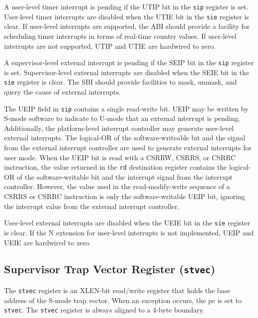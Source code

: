 A user-level timer interrupt is pending if the UTIP bit in the \texttt{sip}
register is set.  User-level timer interrupts are disabled when the UTIE bit
in the \texttt{sie} register is clear.  If user-level interrupts are supported,
the ABI should provide a facility for scheduling timer interrupts in terms of
real-time counter values.  If user-level interrupts are not supported, UTIP
and UTIE are hardwired to zero.

A supervisor-level external interrupt is pending if the SEIP bit in the
\texttt{sip} register is set.  Supervisor-level external interrupts are disabled
when the SEIE bit in the \texttt{sie} register is clear.  The SBI should provide
facilities to mask, unmask, and query the cause of external interrupts.

The UEIP field in \texttt{sip} contains a single read-write bit.  UEIP
may be written by S-mode software to indicate to U-mode that an
external interrupt is pending.  Additionally, the platform-level
interrupt controller may generate user-level external interrupts.  The
logical-OR of the software-writeable bit and the signal from the
external interrupt controller are used to generate external interrupts
for user mode.  When the UEIP bit is read with a CSRRW, CSRRS, or
CSRRC instruction, the value returned in the \texttt{rd} destination
register contains the logical-OR of the software-writable bit and the
interrupt signal from the interrupt controller.  However, the value
used in the read-modify-write sequence of a CSRRS or CSRRC instruction
is only the software-writable UEIP bit, ignoring the interrupt value
from the external interrupt controller.

User-level external interrupts are disabled when the UEIE bit in the \texttt{sie}
register is clear.  If the N extension for user-level interrupts is not
implemented, UEIP and UEIE are hardwired to zero.

\subsection{Supervisor Trap Vector Register
(\texttt{stvec})}\label{supervisor-trap-vector-register-stvec}

The \texttt{stvec} register is an XLEN-bit read/write register that holds the
base address of the S-mode trap vector. When an exception occurs, the pc
is set to \texttt{stvec}. The \texttt{stvec} register is always aligned to a 4-byte
boundary.

\ifdefined\MARKDOWN
\else

